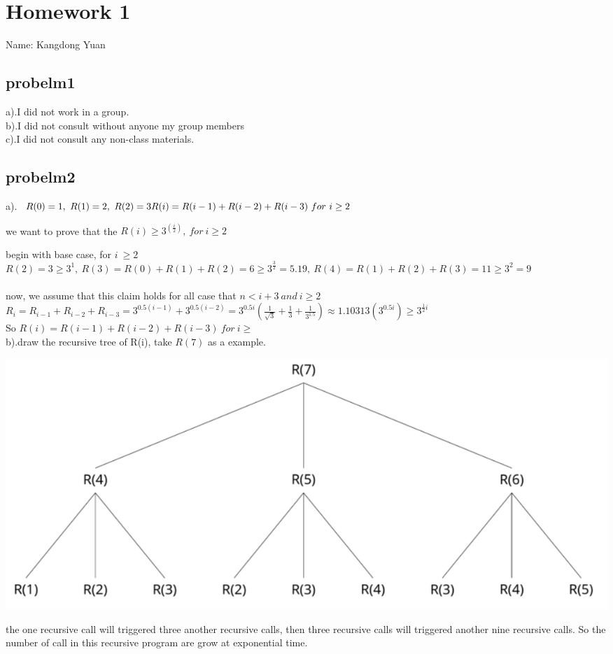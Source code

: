 \documentclass[11pt]{article}
\begin{document}
\section{Homework 1}
Name: Kangdong Yuan

\subsection{probelm1}
a).I did not work in a group.
\\b).I did not consult without anyone my group members
\\c).I did not consult any non-class materials.
\subsection{probelm2}
a).
$R(0)=1,  \  R(1)=2, \ R(2)=3
\\R(i)=R(i-1)+R(i-2)+R(i-3) \ for \ i\geq2$

we want to prove that the $R(i)\geq 3^(\frac{i}{2}), \ for \ i \geq2$

begin with base case, for $i \ \geq 2$
\\$R(2)=3\geq3^1, \ R(3)=R(0)+R(1)+R(2)=6 \geq 3^\frac{3}{2}=5.19, \ R(4)=R(1)+R(2)+R(3)=11 \geq 3^2=9 $
\\
\\now, we assume that this claim holds for all case that $n<i+3 \ and \ i\geq2 $
\\$R_i=R_{i-1}+R_{i-2}+R_{i-3}=3^{0.5(i-1)}+3^{0.5(i-2)}=3^{0.5i}(\frac{1}{\sqrt{3}}+\frac{1}{3}+\frac{1}{3^{1.5}})\approx1.10313(3^{0.5i})\geq3^{\frac{1}{2}i}$
\\So $R(i)=R(i-1)+R(i-2)+R(i-3) \ for \ i\geq$
\\b).draw the recursive tree of R(i), take $R(7)$ as a example. 

\includegraphics[scale=0.5]{Capture}

the one recursive call will triggered three another recursive calls, then three recursive calls will triggered another nine recursive calls. So the number of call in this recursive program are grow at exponential time.
\end{document}
